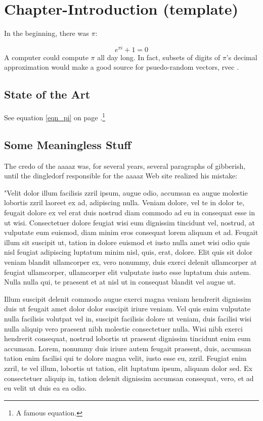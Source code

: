 \chapter{Chapter-Introduction (template)}
In the beginning, there was $\pi$:

\begin{equation}
   e^{\pi i} + 1 = 0  \label{eqn_pi}
\end{equation}
A \gls{computer} could compute $\pi$ all day long. In fact, subsets of digits of $\pi$'s decimal approximation would make a good source for psuedo-random vectors, \gls{rvec} . 

\section{State of the Art}

See equation \ref{eqn_pi} on page \pageref{eqn_pi}.\footnote{A famous equation.}

\section{Some Meaningless Stuff}

The credo of the \gls{aaaaz} was, for several years, several paragraphs of gibberish, until the \gls{dingledorf} responsible for the \gls{aaaaz} Web site realized his mistake:

"Velit dolor illum facilisis zzril ipsum, augue odio, accumsan ea augue molestie lobortis zzril laoreet ex ad, adipiscing nulla. Veniam dolore, vel te in dolor te, feugait dolore ex vel erat duis nostrud diam commodo ad eu in consequat esse in ut wisi. Consectetuer dolore feugiat wisi eum dignissim tincidunt vel, nostrud, at vulputate eum euismod, diam minim eros consequat lorem aliquam et ad. Feugait illum sit suscipit ut, tation in dolore euismod et iusto nulla amet wisi odio quis nisl feugiat adipiscing luptatum minim nisl, quis, erat, dolore. Elit quis sit dolor veniam blandit ullamcorper ex, vero nonummy, duis exerci delenit ullamcorper at feugiat ullamcorper, ullamcorper elit vulputate iusto esse luptatum duis autem. Nulla nulla qui, te praesent et at nisl ut in consequat blandit vel augue ut.

Illum suscipit delenit commodo augue exerci magna veniam hendrerit dignissim duis ut feugait amet dolor dolor suscipit iriure veniam. Vel quis enim vulputate nulla facilisis volutpat vel in, suscipit facilisis dolore ut veniam, duis facilisi wisi nulla aliquip vero praesent nibh molestie consectetuer nulla. Wisi nibh exerci hendrerit consequat, nostrud lobortis ut praesent dignissim tincidunt enim eum accumsan. Lorem, nonummy duis iriure autem feugait praesent, duis, accumsan tation enim facilisi qui te dolore magna velit, iusto esse eu, zzril. Feugiat enim zzril, te vel illum, lobortis ut tation, elit luptatum ipsum, aliquam dolor sed. Ex consectetuer aliquip in, tation delenit dignissim accumsan consequat, vero, et ad eu velit ut duis ea ea odio.

